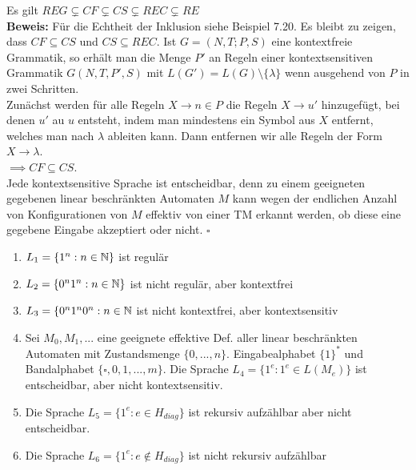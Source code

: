 \begin{satz}{}
    Es gilt $REG \subsetneq CF \subsetneq CS \subsetneq REC \subsetneq RE$\\
    
    \textbf{Beweis:} Für die Echtheit der Inklusion siehe Beispiel 7.20. Es bleibt zu zeigen, dass $CF \subseteq CS$ und $CS \subseteq REC$. Ist $G = (N, T; P, S)$ eine kontextfreie Grammatik, so erhält man die Menge $P'$ an Regeln einer kontextsensitiven Grammatik $G(N, T, P', S)$ mit $L(G') = L(G) \setminus \{\lambda\}$ wenn ausgehend von $P$ in zwei Schritten.\\
    Zunächst werden für alle Regeln $X \to n \in P$ die Regeln $X \to u'$ hinzugefügt, bei denen $u'$ au $u$ entsteht, indem man mindestens ein Symbol aus $X$ entfernt, welches man nach $\lambda$ ableiten kann. Dann entfernen wir alle Regeln der Form $X \to \lambda$.\\
    $\implies CF \subseteq CS$.\\
    Jede kontextsensitive Sprache ist entscheidbar, denn zu einem geeigneten gegebenen linear beschränkten Automaten $M$ kann wegen der endlichen Anzahl von Konfigurationen von $M$ effektiv von einer TM erkannt werden, ob diese eine gegebene Eingabe akzeptiert oder nicht. \hspace*{\fill}$\square$
\end{satz}

\begin{exam}
    \begin{enumerate}[label=(\roman*)]
        \item $L_1 = \{1^n : n \in \mathbb{N}\}$ ist regulär
        \item $L_2 = \{0^n 1^n : n \in \mathbb{N}\}$ ist nicht regulär, aber kontextfrei
        \item $L_3 = \{0^n 1^n 0^n : n \in \mathbb{N}$ ist nicht kontextfrei, aber kontextsensitiv
        \item Sei $M_0, M_1, ...$ eine geeignete effektive Def. aller linear beschränkten Automaten mit Zustandsmenge $\{0, ..., n\}$. Eingabealphabet $\{1\}^*$ und Bandalphabet $\{\square, 0, 1, ..., m\}$. Die Sprache $L_4 = \{1^e : 1^e \in L(M_e)\}$ ist entscheidbar, aber nicht kontextsensitiv.
        \item Die Sprache $L_5 = \{1^e : e \in H_{diag}\}$ ist rekursiv aufzählbar aber nicht entscheidbar.
        \item Die Sprache $L_6 = \{1^e : e \not\in H_{diag}\}$ ist nicht rekursiv aufzählbar
    \end{enumerate}
\end{exam}